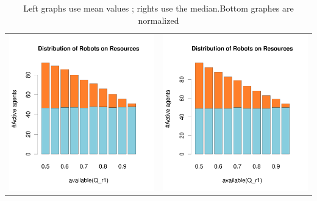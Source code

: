 \documentclass[a4paper,10pt]{article}
\begin{document}
\begin{table}[H]
\caption{Left graphs use mean values ; rights use the median.Bottom graphes are normalized}
\begin{tabular}{cc}
\includegraphics[width=\imgSize]{../images/5StaticEnv/barplotAliveR1AndR2_mean_env4}& \includegraphics[width=\imgSize]{../images/5StaticEnv/barplotAliveR1AndR2_median_env4}\\

\end{tabular}
\end{table}
\end{document}
